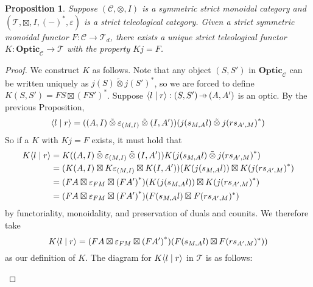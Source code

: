 \documentclass[11pt,letterpaper]{article}
\theoremstyle{plain}
\newtheorem{proposition}[theorem]{Proposition}
\theoremstyle{definition}
\newcommand{\C}{\mathscr{C}}
\newcommand{\T}{\mathscr{T}}
\newcommand{\Optic}{\mathbf{Optic}}
\newcommand{\switched}{\mathbin{\tilde{\otimes}}}
\newcommand{\teletimes}{\mathbin{\boxtimes}}
\newcommand{\rep}[2]{{\ensuremath \left\langle #1 \mid #2 \right\rangle}}
\newcommand{\hto}{\ensuremath{\,\mathaccent\shortmid\rightarrow\,}}
\begin{document}
\begin{proposition}
  Suppose $(\C, \otimes, I)$ is a symmetric strict monoidal category and $(\T, \teletimes, I, {(-)}^*, \varepsilon)$ is a strict teleological category. Given a strict symmetric monoidal functor $F : \C \to \T_d$, there exists a unique strict teleological functor $K : \Optic_\C \to \T$ with the property $Kj = F$.
\end{proposition}
\begin{proof}
  We construct $K$ as follows. Note that any object $(S, S')$ in $\Optic_\C$ can be written uniquely as $j(S) \switched {j(S')}^*$, so we are forced to define $K(S, S') = FS \teletimes {(FS')}^*$. Suppose $\rep{l}{r} : (S, S') \hto (A, A')$ is an optic. By the previous Proposition,
  \begin{align*}
    \rep{l}{r} = ((A, I) \switched \varepsilon_{(M, I)} \switched (I, A'))(j(s_{M,A}l) \switched {j(rs_{A', M})}^*)
  \end{align*}
  So if a $K$ with $Kj = F$ exists, it must hold that
  \begin{align*}
      K\rep{l}{r} 
      &= K((A, I) \switched \varepsilon_{(M, I)} \switched (I, A')) K(j(s_{M,A}l) \switched {j(rs_{A', M})}^*) \\
      &= (K(A, I) \teletimes K\varepsilon_{(M, I)} \teletimes K(I, A')) (K(j(s_{M,A}l)) \teletimes K( {j(rs_{A', M})}^*) \\
      &= (FA \teletimes \varepsilon_{FM} \teletimes {(FA')}^*) (K(j(s_{M,A}l)) \teletimes K( {j(rs_{A', M})}^*) \\
      &= (FA \teletimes \varepsilon_{FM} \teletimes {(FA')}^*) (F(s_{M,A}l) \teletimes F(rs_{A', M})^*)
  \end{align*}
  by functoriality, monoidality, and preservation of duals and counits. We therefore take \[  K\rep{l}{r} = (FA \teletimes \varepsilon_{FM} \teletimes {(FA')}^*) (F(s_{M,A}l) \teletimes F(rs_{A', M})^*)) \] as our definition of $K$. The diagram for $K\rep{l}{r}$ in $\T$ is as follows:
  \begin{center}
    
  \end{center}

\end{proof}
\end{document}

